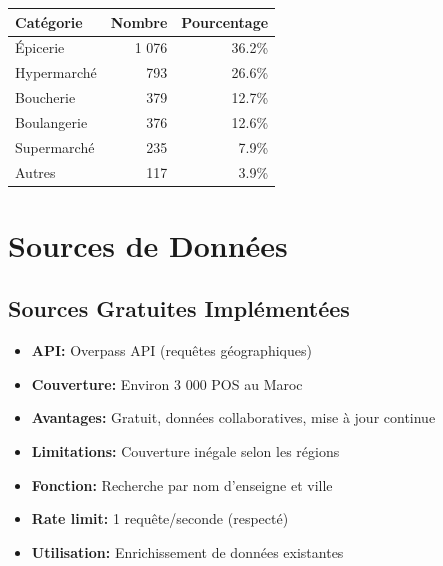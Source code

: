 \documentclass[11pt,a4paper]{article}
\begin{document}
\begin{center}
\begin{tabular}{lrr}
\toprule
\textbf{Catégorie} & \textbf{Nombre} & \textbf{Pourcentage} \\
\midrule
Épicerie & 1 076 & 36.2\% \\
Hypermarché & 793 & 26.6\% \\
Boucherie & 379 & 12.7\% \\
Boulangerie & 376 & 12.6\% \\
Supermarché & 235 & 7.9\% \\
Autres & 117 & 3.9\% \\
\bottomrule
\end{tabular}
\end{center}


\section{Sources de Données}

\subsection{Sources Gratuites Implémentées}

\begin{successbox}
\begin{itemize}[leftmargin=*,nosep]
    \item \textbf{API:} Overpass API (requêtes géographiques)
    \item \textbf{Couverture:} Environ 3 000 POS au Maroc
    \item \textbf{Avantages:} Gratuit, données collaboratives, mise à jour continue
    \item \textbf{Limitations:} Couverture inégale selon les régions
\end{itemize}
\end{successbox}

\vspace{0.5cm}

\begin{successbox}
\begin{itemize}[leftmargin=*,nosep]
    \item \textbf{Fonction:} Recherche par nom d'enseigne et ville
    \item \textbf{Rate limit:} 1 requête/seconde (respecté)
    \item \textbf{Utilisation:} Enrichissement de données existantes
\end{itemize}
\end{successbox}
\end{document}
